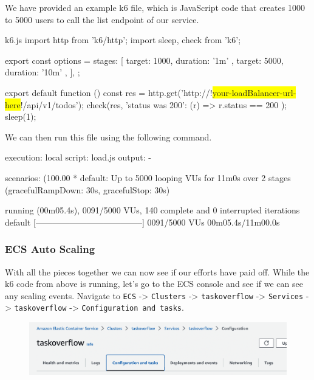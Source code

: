 \documentclass{csse4400}
\begin{document}
We have provided an example k6 file, which is JavaScript code that creates
1000 to 5000 users to call the list endpoint of our service.

\begin{code}[language=javascript,numbers=none,escapechar=!]{k6.js}
import http from 'k6/http';
import { sleep, check } from 'k6';

export const options = {
  stages: [
    { target: 1000, duration: '1m' },
    { target: 5000, duration: '10m' },
  ],
};

export default function () {
  const res = http.get('http://!\colorbox{yellow}{your-loadBalancer-url-here}!/api/v1/todos');
  check(res, { 'status was 200': (r) => r.status == 200 });
  sleep(1);
}
\end{code}

We can then run this file using the following command.


\begin{code}[language=bash,numbers=none,keepspaces=true]{}
execution: local
  script: load.js
  output: -

scenarios: (100.00%
        * default: Up to 5000 looping VUs for 11m0s over 2 stages (gracefulRampDown: 30s, gracefulStop: 30s)


running (00m05.4s), 0091/5000 VUs, 140 complete and 0 interrupted iterations
default   [--------------------------------------] 0091/5000 VUs  00m05.4s/11m00.0s

\end{code}

\subsubsection{ECS Auto Scaling}

With all the pieces together we can now see if our efforts have paid off.
While the k6 code from above is running, let's go to the ECS console and see if we can see any scaling events.
Navigate to \texttt{ECS} -> \texttt{Clusters} -> \texttt{taskoverflow} -> \texttt{Services} -> \texttt{taskoverflow} -> \texttt{Configuration and tasks}.

\begin{figure}[H]
  \begin{center}
    \includegraphics[width=\textwidth]{images/ecs1}
  \end{center}
\end{figure}
\end{document}
